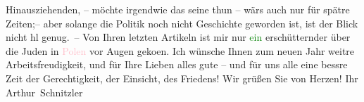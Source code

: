                     Hinausziehenden, – möchte irgendwie das seine thun – wärs auch nur für spätre
                    Zeiten;– aber solange die Politik noch nicht Geschichte  geworden ist, ist der Blick nicht hl {\pb}genug. – Von Ihren letzten
                    Artikeln ist mir nur \textcolor{green}{ein}{}
                    erschütternder über die Juden in \textcolor{pink}{Polen}{}\ledrightnote{\textcolor{pink}{Polen}} vor
                    Augen geko{\geminationm}en. Ich wünsche Ihnen zum neuen Jahr
                    weitre Arbeitsfreudigkeit, und für Ihre Lieben alles gute – und für uns alle
                    eine bessre Zeit der Gerechtigkeit, der Einsicht, des Friedens! Wir grüßen Sie
                    von Herzen! Ihr \spacefill\mbox{Arthur Schnitzler}\pend
           \endnumbering{}  
      